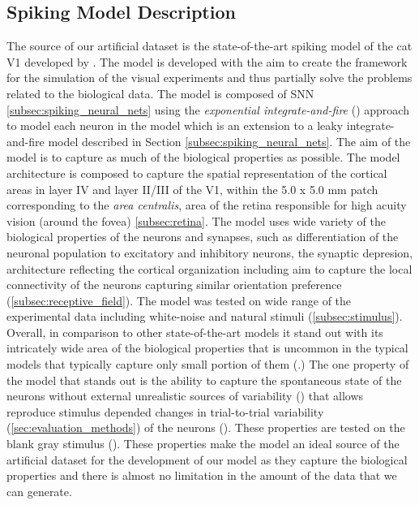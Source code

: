 \subsection{Spiking Model Description}
\label{subsec:spiking_model_description}
The source of our artificial dataset is the state-of-the-art spiking model of the cat V1 developed by \citet{antolik2024comprehensive}. The model is developed with the aim to create the framework for the simulation of the visual experiments and thus partially solve the problems related to the biological data. The model is composed of SNN \ref{subsec:spiking_neural_nets} using the \emph{exponential integrate-and-fire} (\citet{FourcaudTrocm11628}) approach to model each neuron in the model which is an extension to a leaky integrate-and-fire model described in Section \ref{subsec:spiking_neural_nets}. The aim of the model is to capture as much of the biological properties as possible. The model architecture is composed to capture the spatial representation of the cortical areas in layer IV and layer II/III of the V1, within the 5.0 x 5.0 mm patch corresponding to the \emph{area centralis}, area of the retina responsible for high acuity vision (around the fovea) \ref{subsec:retina}. The model uses wide variety of the biological properties of the neurons and synapses, such as differentiation of the neuronal population to excitatory and inhibitory neurons, the synaptic depresion, architecture reflecting the cortical organization including aim to capture the local connectivity of the neurons capturing similar orientation preference (\ref{subsec:receptive_field}). The model was tested on wide range of the experimental data including white-noise and natural stimuli (\ref{subsec:stimulus}). Overall, in comparison to other state-of-the-art models it stand out with its intricately wide area of the biological properties that is uncommon in the typical models that typically capture only small portion of them (\citet{antolik2024comprehensive}.) The one property of the model that stands out is the ability to capture the spontaneous state of the neurons without external unrealistic sources of variability (\citet{antolik2024comprehensive}) that allows reproduce stimulus depended changes in trial-to-trial variability (\ref{sec:evaluation_methods}) of the neurons (\citet{baudot_animation_2013}). These properties are tested on the blank gray stimulus (\citet{PAPAIOANNOU1972558}). These properties make the model an ideal source of the artificial dataset for the development of our model as they capture the biological properties and there is almost no limitation in the amount of the data that we can generate.

